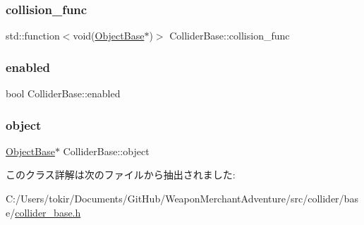 \subsubsection{\texorpdfstring{collision\+\_\+func}{collision\_func}}
{\footnotesize\ttfamily std\+::function$<$void(\mbox{\hyperlink{class_object_base}{Object\+Base}}$\ast$)$>$ Collider\+Base\+::collision\+\_\+func}

\mbox{\label{class_collider_base_a812053f247dc6357357bdf9353dded77}} 
\subsubsection{\texorpdfstring{enabled}{enabled}}
{\footnotesize\ttfamily bool Collider\+Base\+::enabled}

\mbox{\label{class_collider_base_a63adac6a75877857abe9ff2cf4274157}} 
\subsubsection{\texorpdfstring{object}{object}}
{\footnotesize\ttfamily \mbox{\hyperlink{class_object_base}{Object\+Base}}$\ast$ Collider\+Base\+::object}



このクラス詳解は次のファイルから抽出されました\+:\begin{DoxyCompactItemize}
\item 
C\+:/\+Users/tokir/\+Documents/\+Git\+Hub/\+Weapon\+Merchant\+Adventure/src/collider/base/\mbox{\hyperlink{collider__base_8h}{collider\+\_\+base.\+h}}\end{DoxyCompactItemize}
